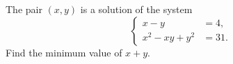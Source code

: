 The pair $(x,y)$ is a solution of the system \[\left\{\begin{aligned} x-y &=4, \\ x^{2}-xy+y^{2} &=31. \end{aligned}\right.\]Find the minimum value of $x+y$.
